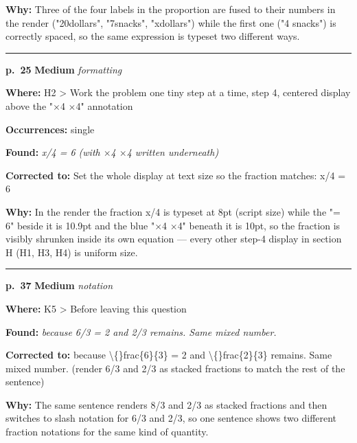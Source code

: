 \documentclass[11pt]{article}
\newcommand{\sevmed}[1]{\textcolor{orange!80!black}{\textbf{#1}}}
\begin{document}
\noindent\textbf{Why: }Three of the four labels in the proportion are fused to their numbers in the render ("20dollars", "7snacks", "xdollars") while the first one ("4 snacks") is correctly spaced, so the same expression is typeset two different ways.\par\vspace{4pt}
\noindent\rule{\textwidth}{0.4pt}\par\nobreak\vspace{2pt}
\noindent\textbf{p.~25} \quad \sevmed{Medium} \quad \textit{formatting}\par
\noindent\textbf{Where: }H2 > Work the problem one tiny step at a time, step 4, centered display above the "$\times$4 $\times$4" annotation\par
\noindent\textbf{Occurrences: }single\par
\noindent\textbf{Found: }\textit{x/4 = 6 (with $\times$4 $\times$4 written underneath)}\par
\noindent\textbf{Corrected to: }Set the whole display at text size so the fraction matches: x/4 = 6\par
\noindent\textbf{Why: }In the render the fraction x/4 is typeset at 8pt (script size) while the "= 6" beside it is 10.9pt and the blue "$\times$4 $\times$4" beneath it is 10pt, so the fraction is visibly shrunken inside its own equation --- every other step-4 display in section H (H1, H3, H4) is uniform size.\par\vspace{4pt}
\noindent\rule{\textwidth}{0.4pt}\par\nobreak\vspace{2pt}
\noindent\textbf{p.~37} \quad \sevmed{Medium} \quad \textit{notation}\par
\noindent\textbf{Where: }K5 > Before leaving this question\par
\noindent\textbf{Found: }\textit{because 6/3 = 2 and 2/3 remains. Same mixed number.}\par
\noindent\textbf{Corrected to: }because \textbackslash\{\}frac\{6\}\{3\} = 2 and \textbackslash\{\}frac\{2\}\{3\} remains. Same mixed number. (render 6/3 and 2/3 as stacked fractions to match the rest of the sentence)\par
\noindent\textbf{Why: }The same sentence renders 8/3 and 2/3 as stacked fractions and then switches to slash notation for 6/3 and 2/3, so one sentence shows two different fraction notations for the same kind of quantity.\par\vspace{4pt}
\end{document}
